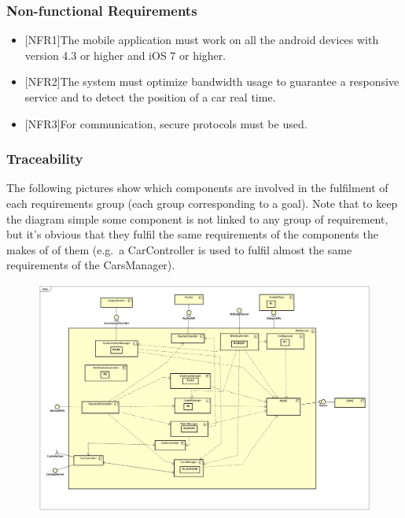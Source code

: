 \documentclass[]{article}
\providecommand{\tightlist}{%
  \setlength{\itemsep}{0pt}\setlength{\parskip}{0pt}}
\begin{document}
\subsubsection{Non-functional
Requirements}\label{non-functional-requirements}

\begin{itemize}
\tightlist
\item
  {[}NFR1{]}The mobile application must work on all the android devices
  with version 4.3 or higher and iOS 7 or higher.
\item
  {[}NFR2{]}The system must optimize bandwidth usage to guarantee a
  responsive service and to detect the position of a car real time.
\item
  {[}NFR3{]}For communication, secure protocols must be used.
\end{itemize}

\subsubsection{Traceability}\label{traceability}

The following pictures show which components are involved in the
fulfilment of each requirements group (each group corresponding to a
goal). Note that to keep the diagram simple some component is not linked
to any group of requirement, but it's obvious that they fulfil the same
requirements of the components the makes of of them (e.g.~a
CarController is used to fulfil almost the same requirements of the
CarsManager).

\begin{figure}
\centering
\includegraphics[width=1.00000\textwidth,height=1.00000\textwidth]{./comp_diagrams/system_reqt.png}
\caption{}\label{id}
\end{figure}
\end{document}
